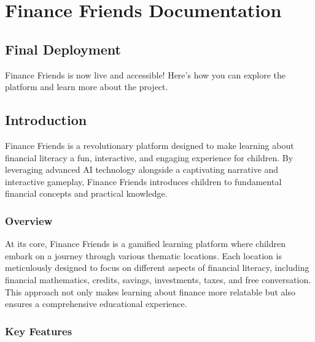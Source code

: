 \hypertarget{finance-friends-documentation}{%
\section{Finance Friends
Documentation}\label{finance-friends-documentation}}

\hypertarget{final-deployment}{%
\subsection{Final Deployment}\label{final-deployment}}

Finance Friends is now live and accessible! Here's how you can explore
the platform and learn more about the project.

\hypertarget{introduction}{%
\subsection{Introduction}\label{introduction}}

Finance Friends is a revolutionary platform designed to make learning
about financial literacy a fun, interactive, and engaging experience for
children. By leveraging advanced AI technology alongside a captivating
narrative and interactive gameplay, Finance Friends introduces children
to fundamental financial concepts and practical knowledge.

\hypertarget{overview}{%
\subsubsection{Overview}\label{overview}}

At its core, Finance Friends is a gamified learning platform where
children embark on a journey through various thematic locations. Each
location is meticulously designed to focus on different aspects of
financial literacy, including financial mathematics, credits, savings,
investments, taxes, and free conversation. This approach not only makes
learning about finance more relatable but also ensures a comprehensive
educational experience.

\hypertarget{key-features}{%
\subsubsection{Key Features}\label{key-features}}

